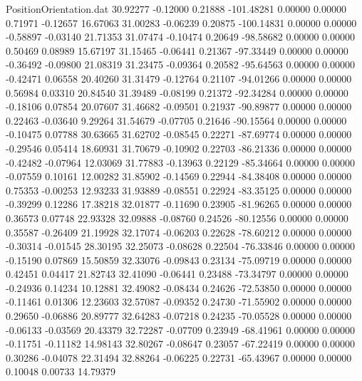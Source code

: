 \begin{filecontents}{PositionOrientation.dat}
  30.92277   -0.12000    0.21888  -101.48281    0.00000    0.00000    0.71971   -0.12657   16.67063
  31.00283   -0.06239    0.20875  -100.14831    0.00000    0.00000   -0.58897   -0.03140   21.71353
  31.07474   -0.10474    0.20649   -98.58682    0.00000    0.00000    0.50469    0.08989   15.67197
  31.15465   -0.06441    0.21367   -97.33449    0.00000    0.00000   -0.36492   -0.09800   21.08319
  31.23475   -0.09364    0.20582   -95.64563    0.00000    0.00000   -0.42471    0.06558   20.40260
  31.31479   -0.12764    0.21107   -94.01266    0.00000    0.00000    0.56984    0.03310   20.84540
  31.39489   -0.08199    0.21372   -92.34284    0.00000    0.00000   -0.18106    0.07854   20.07607
  31.46682   -0.09501    0.21937   -90.89877    0.00000    0.00000    0.22463   -0.03640    9.29264
  31.54679   -0.07705    0.21646   -90.15564    0.00000    0.00000   -0.10475    0.07788   30.63665
  31.62702   -0.08545    0.22271   -87.69774    0.00000    0.00000   -0.29546    0.05414   18.60931
  31.70679   -0.10902    0.22703   -86.21336    0.00000    0.00000   -0.42482   -0.07964   12.03069
  31.77883   -0.13963    0.22129   -85.34664    0.00000    0.00000   -0.07559    0.10161   12.00282
  31.85902   -0.14569    0.22944   -84.38408    0.00000    0.00000    0.75353   -0.00253   12.93233
  31.93889   -0.08551    0.22924   -83.35125    0.00000    0.00000   -0.39299    0.12286   17.38218
  32.01877   -0.11690    0.23905   -81.96265    0.00000    0.00000    0.36573    0.07748   22.93328
  32.09888   -0.08760    0.24526   -80.12556    0.00000    0.00000    0.35587   -0.26409   21.19928
  32.17074   -0.06203    0.22628   -78.60212    0.00000    0.00000   -0.30314   -0.01545   28.30195
  32.25073   -0.08628    0.22504   -76.33846    0.00000    0.00000   -0.15190    0.07869   15.50859
  32.33076   -0.09843    0.23134   -75.09719    0.00000    0.00000    0.42451    0.04417   21.82743
  32.41090   -0.06441    0.23488   -73.34797    0.00000    0.00000   -0.24936    0.14234   10.12881
  32.49082   -0.08434    0.24626   -72.53850    0.00000    0.00000   -0.11461    0.01306   12.23603
  32.57087   -0.09352    0.24730   -71.55902    0.00000    0.00000    0.29650   -0.06886   20.89777
  32.64283   -0.07218    0.24235   -70.05528    0.00000    0.00000   -0.06133   -0.03569   20.43379
  32.72287   -0.07709    0.23949   -68.41961    0.00000    0.00000   -0.11751   -0.11182   14.98143
  32.80267   -0.08647    0.23057   -67.22419    0.00000    0.00000    0.30286   -0.04078   22.31494
  32.88264   -0.06225    0.22731   -65.43967    0.00000    0.00000    0.10048    0.00733   14.79379

\end{filecontents}
